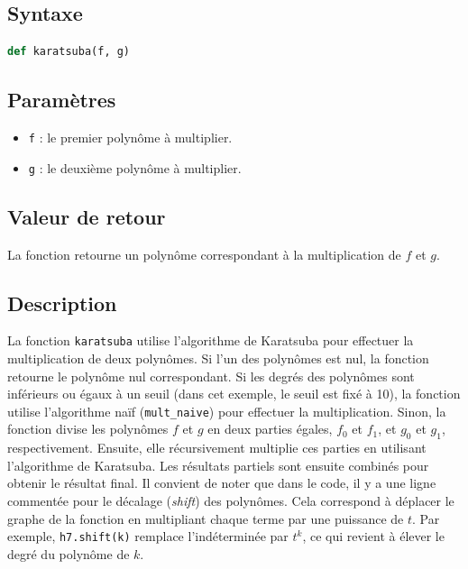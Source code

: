 \documentclass[a4paper]{article}
\begin{document}
\subsection*{Syntaxe}

\begin{lstlisting}[language=Python]
def karatsuba(f, g)
\end{lstlisting}

\subsection*{Paramètres}

\begin{itemize}
  \item \texttt{f} : le premier polynôme à multiplier.
  \item \texttt{g} : le deuxième polynôme à multiplier.
\end{itemize}

\subsection*{Valeur de retour}

La fonction retourne un polynôme correspondant à la multiplication de $f$ et $g$.

\subsection*{Description}

La fonction \texttt{karatsuba} utilise l'algorithme de Karatsuba pour effectuer la multiplication de deux polynômes. Si l'un des polynômes est nul, la fonction retourne le polynôme nul correspondant. Si les degrés des polynômes sont inférieurs ou égaux à un seuil (dans cet exemple, le seuil est fixé à 10), la fonction utilise l'algorithme naïf (\texttt{mult\_naive}) pour effectuer la multiplication.
Sinon, la fonction divise les polynômes $f$ et $g$ en deux parties égales, $f_0$ et $f_1$, et $g_0$ et $g_1$, respectivement. Ensuite, elle récursivement multiplie ces parties en utilisant l'algorithme de Karatsuba. Les résultats partiels sont ensuite combinés pour obtenir le résultat final.
Il convient de noter que dans le code, il y a une ligne commentée pour le décalage (\textit{shift}) des polynômes. Cela correspond à déplacer le graphe de la fonction en multipliant chaque terme par une puissance de $t$. Par exemple, \texttt{h7.shift(k)} remplace l'indéterminée par $t^k$, ce qui revient à élever le degré du polynôme de $k$.
\end{document}
